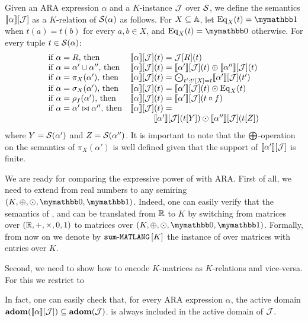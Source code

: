 Given an ARA expression $\alpha$ and a $K$-instance $\mathcal{J}$ over $\mathcal{S}$, we define the semantics $\llbracket \alpha \rrbracket[\mathcal{J}]$ as a $K$-relation of $\mathcal{S}(\alpha)$ as follows. For $X \subseteq \mathbb{A}$, let $\operatorname{Eq}_X(t) = \kone$ when $t(a) = t(b)$ for every $a, b \in X$, and $\operatorname{Eq}_X(t) = \kzero$ otherwise. For every tuple $t \in \mathcal{S}(\alpha)$:
$$
\begin{array}{ll}
\text{if $\alpha = R$, then} & \llbracket \alpha \rrbracket[\mathcal{J}](t) = \mathcal{J}[R](t) \\
\text{if $\alpha = \alpha' \cup \alpha''$, then} & \llbracket \alpha \rrbracket[\mathcal{J}](t) = \llbracket \alpha' \rrbracket[\mathcal{J}](t) \oplus \llbracket \alpha'' \rrbracket[\mathcal{J}](t)  \\
\text{if $\alpha = \pi_X(\alpha')$, then} & \llbracket \alpha \rrbracket[\mathcal{J}](t) = \bigodot_{t': t'[X] = t} \llbracket \alpha' \rrbracket[\mathcal{J}](t') \\
\text{if $\alpha = \sigma_X(\alpha')$, then} & \llbracket \alpha \rrbracket[\mathcal{J}](t) = 
\llbracket \alpha' \rrbracket[\mathcal{J}](t) \odot \operatorname{Eq}_X(t)  \\
\text{if $\alpha = \rho_f(\alpha')$, then} & \llbracket \alpha \rrbracket[\mathcal{J}](t) = 
\llbracket \alpha' \rrbracket[\mathcal{J}](t \circ f)  
\\
\text{if $\alpha = \alpha' \bowtie \alpha''$, then} & \llbracket \alpha \rrbracket[\mathcal{J}](t) = \\
& \hspace{1cm} \llbracket \alpha' \rrbracket[\mathcal{J}](t[Y]) \odot  \llbracket \alpha'' \rrbracket[\mathcal{J}](t[Z])
\end{array}
$$
where $Y = \mathcal{S}(\alpha')$ and $Z = \mathcal{S}(\alpha'')$. It is important to note that the $\bigoplus$-operation on the semantics of $\pi_X(\alpha')$ is well defined given that the support of $\llbracket \alpha' \rrbracket[\mathcal{J}]$ is finite. 

We are ready for comparing the expressive power of \langsum with ARA. First of all, we need to extend \langsum from real numbers to any semiring $(K, \ksum, \kprod, \kzero, \kone)$. Indeed, one can easily verify that the semantics of \lang, \langfor and \langsum can be translated from $\mathbb{R}$ to $K$ by switching from matrices over $(\mathbb{R}, +, \times, 0, 1)$ to matrices over $(K, \ksum, \kprod, \kzero, \kone)$.
Formally, from now on we denote by $\text{\texttt{sum}-\texttt{MATLANG} }\![K]$ the instance of \langsum over matrices with entries over $K$. 

Second, we need to show how to encode $K$-matrices as $K$-relations and vice-versa. For this we restrict to 




In fact, one can easily check that, for every ARA expression $\alpha$, the active domain $\mathbf{adom}(\llbracket \alpha \rrbracket[\mathcal{J}]) \subseteq \mathbf{adom}(\mathcal{J})$. is always included in the active domain of $\mathcal{J}$.




